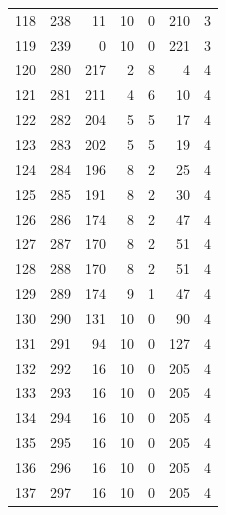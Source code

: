 \documentclass[a4paper,twoside,12pt]{book}
\begin{document}
\begin{appendices}
\begin{table}
\begin{tabular}{lrrrrrr}
		118 &    238 &        11 &        10 &               0 &             210 &         3 \\
		119 &    239 &         0 &        10 &               0 &             221 &         3 \\
		120 &    280 &       217 &         2 &               8 &               4 &         4 \\
		121 &    281 &       211 &         4 &               6 &              10 &         4 \\
		122 &    282 &       204 &         5 &               5 &              17 &         4 \\
		123 &    283 &       202 &         5 &               5 &              19 &         4 \\
		124 &    284 &       196 &         8 &               2 &              25 &         4 \\
		125 &    285 &       191 &         8 &               2 &              30 &         4 \\
		126 &    286 &       174 &         8 &               2 &              47 &         4 \\
		127 &    287 &       170 &         8 &               2 &              51 &         4 \\
		128 &    288 &       170 &         8 &               2 &              51 &         4 \\
		129 &    289 &       174 &         9 &               1 &              47 &         4 \\
		130 &    290 &       131 &        10 &               0 &              90 &         4 \\
		131 &    291 &        94 &        10 &               0 &             127 &         4 \\
		132 &    292 &        16 &        10 &               0 &             205 &         4 \\
		133 &    293 &        16 &        10 &               0 &             205 &         4 \\
		134 &    294 &        16 &        10 &               0 &             205 &         4 \\
		135 &    295 &        16 &        10 &               0 &             205 &         4 \\
		136 &    296 &        16 &        10 &               0 &             205 &         4 \\
		137 &    297 &        16 &        10 &               0 &             205 &         4 \\

\end{tabular}
\end{table}
\end{appendices}
\end{document}
